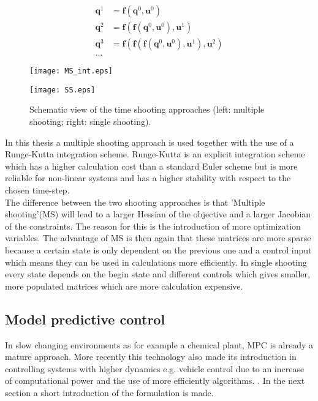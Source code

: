 \begin{enumerate}
	\begin{equation}\label{eq:2}
	\begin{aligned}
	\bm{q}^1 &= \bm{f}(\bm{q}^0, \bm{u}^0)\\
	\bm{q}^2 &= \bm{f}(\bm{f}(\bm{q}^0, \bm{u}^0), \bm{u}^1)\\
	\bm{q}^3 &= \bm{f}(\bm{f}(\bm{f}(\bm{q}^0, \bm{u}^0), \bm{u}^1), \bm{u}^2)\\
	...
	\end{aligned}
	\end{equation}
\end{enumerate}

\begin{figure}[htp]
	\centering
	\begin{minipage}{0.49\textwidth}
		\centering
		\texttt{[image: MS\_int.eps]}
	\end{minipage}
	\hfill
	\begin{minipage}{.49\textwidth}
		\centering
		\texttt{[image: SS.eps]}
	\end{minipage}
	\caption{Schematic view of the time shooting approaches (left: multiple shooting; right: single shooting).}
	\label{fig:TS}
\end{figure}

In this thesis a multiple shooting approach is used together with the use of a Runge-Kutta integration scheme. Runge-Kutta is an explicit integration scheme which has a higher calculation cost than a standard Euler scheme but is more reliable for non-linear systems and has a higher stability with respect to the chosen time-step. \cite{Mercy2018}  \\ 

The difference between the two shooting approaches is that 'Multiple shooting'(MS) will lead to a larger Hessian of the objective and a larger Jacobian of the constraints. The reason for this is the introduction of more optimization variables. The advantage of MS is then again that these matrices are more sparse because a certain state is only dependent on the previous one and a control input which means they can be used in calculations more efficiently. In single shooting every state depends on the begin state and different controls which gives smaller, more populated matrices which are more calculation expensive. \cite{Gillis2019}

\subsection{Model predictive control}
\label{s:MPC_e}
In slow changing environments as for example a chemical plant, MPC is already a mature approach. More recently this technology also made its introduction in controlling systems with higher dynamics e.g. vehicle control due to an increase of computational power and the use of more efficiently algorithms. \cite{Mercy2018}. In the next section a short introduction of the formulation is made. \\

